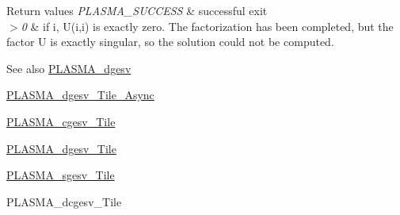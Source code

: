 \begin{DoxyRetVals}{Return values}
{\em P\+L\+A\+S\+M\+A\+\_\+\+S\+U\+C\+C\+E\+S\+S} & successful exit \\
\hline
{\em $>$0} & if i, U(i,i) is exactly zero. The factorization has been completed, but the factor U is exactly singular, so the solution could not be computed.\\
\hline
\end{DoxyRetVals}
\begin{DoxySeeAlso}{See also}
\hyperlink{group__double_gae380e95b53e07b9b1261aec244191c0f_gae380e95b53e07b9b1261aec244191c0f}{P\+L\+A\+S\+M\+A\+\_\+dgesv} 

\hyperlink{group__double__Tile__Async_ga1a8cc58569c097961b0838a5561479e7_ga1a8cc58569c097961b0838a5561479e7}{P\+L\+A\+S\+M\+A\+\_\+dgesv\+\_\+\+Tile\+\_\+\+Async} 

\hyperlink{group__PLASMA__Complex32__t__Tile_ga0dfdc0c54977335c9afb38f60764274d_ga0dfdc0c54977335c9afb38f60764274d}{P\+L\+A\+S\+M\+A\+\_\+cgesv\+\_\+\+Tile} 

\hyperlink{group__double__Tile_gaacf09cca256b82b81087dffa3cabe2d8_gaacf09cca256b82b81087dffa3cabe2d8}{P\+L\+A\+S\+M\+A\+\_\+dgesv\+\_\+\+Tile} 

\hyperlink{group__float__Tile_gaff4ad087d2efc588d2ca4152c4edd398_gaff4ad087d2efc588d2ca4152c4edd398}{P\+L\+A\+S\+M\+A\+\_\+sgesv\+\_\+\+Tile} 

P\+L\+A\+S\+M\+A\+\_\+dcgesv\+\_\+\+Tile 
\end{DoxySeeAlso}
\hypertarget{group__double__Tile_ga0b7678b8af5b6f5783d5a2dc29bbe9f4_ga0b7678b8af5b6f5783d5a2dc29bbe9f4}{}
